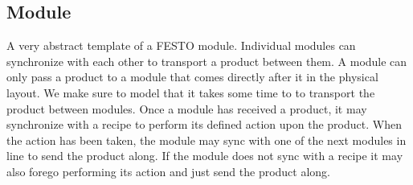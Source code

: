\subsection{Module}
A very abstract template of a FESTO module.  
Individual modules can synchronize with each other to transport a product between them. A module can only pass a product to a module that comes directly after it in the physical layout. We make sure to model that it takes some time to to transport the product between modules. 
Once a module has received a product, it may synchronize with a recipe to perform its defined action upon the product. When the action has been taken, the module may sync with one of the next modules in line to send the product along. If the module does not sync with a recipe it may also forego performing its action and just send the product along. 
